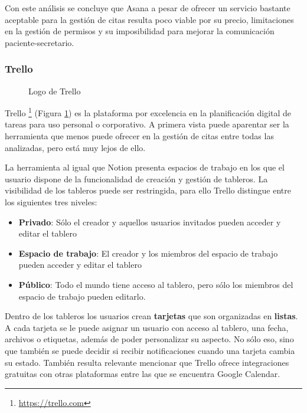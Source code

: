 Con este análisis se concluye que Asana a pesar de ofrecer un servicio bastante aceptable para la gestión de citas resulta poco viable por su precio, limitaciones en la gestión de permisos y su imposibilidad para mejorar la comunicación paciente-secretario.


\subsubsection*{Trello}

\begin{figure}[H]
    \caption{Logo de Trello}
    \label{fig:trello-logo}
\end{figure}

Trello \footnote{\url{https://trello.com}} (Figura \ref{fig:trello-logo}) es la plataforma por excelencia en la planificación digital de tareas para uso personal o corporativo.  A primera vista puede aparentar ser la herramienta que menos puede ofrecer en la gestión de citas entre todas las analizadas, pero está muy lejos de ello. \bigskip

La herramienta al igual que Notion presenta espacios de trabajo en los que el usuario dispone de la funcionalidad de creación y gestión de tableros. La visibilidad de los tableros puede ser restringida, para ello Trello distingue entre los siguientes tres niveles:

\begin{itemize}
    \item \textbf{Privado}: Sólo el creador y aquellos usuarios invitados pueden acceder y editar el tablero 
    \item \textbf{Espacio de trabajo}: El creador y los miembros del espacio de trabajo pueden acceder y editar el tablero
    \item \textbf{Público}: Todo el mundo tiene acceso al tablero, pero sólo los miembros del espacio de trabajo pueden editarlo.
\end{itemize}

Dentro de los tableros los usuarios crean \textbf{tarjetas} que son organizadas en \textbf{listas}. A cada tarjeta se le puede asignar un usuario con acceso al tablero, una fecha, archivos o etiquetas, además de poder personalizar su aspecto. No sólo eso, sino que también se puede decidir si recibir notificaciones cuando una tarjeta cambia su estado. También resulta relevante mencionar que Trello ofrece integraciones gratuitas con otras plataformas entre las que se encuentra Google Calendar. \bigskip

